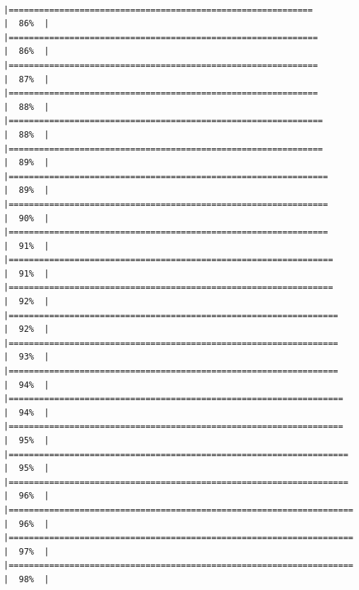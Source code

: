 \documentclass[
]{article}
\begin{document}
\begin{verbatim}
          |============================================================          |  86%  |                                                                              |=============================================================         |  86%  |                                                                              |=============================================================         |  87%  |                                                                              |=============================================================         |  88%  |                                                                              |==============================================================        |  88%  |                                                                              |==============================================================        |  89%  |                                                                              |===============================================================       |  89%  |                                                                              |===============================================================       |  90%  |                                                                              |===============================================================       |  91%  |                                                                              |================================================================      |  91%  |                                                                              |================================================================      |  92%  |                                                                              |=================================================================     |  92%  |                                                                              |=================================================================     |  93%  |                                                                              |=================================================================     |  94%  |                                                                              |==================================================================    |  94%  |                                                                              |==================================================================    |  95%  |                                                                              |===================================================================   |  95%  |                                                                              |===================================================================   |  96%  |                                                                              |====================================================================  |  96%  |                                                                              |====================================================================  |  97%  |                                                                              |====================================================================  |  98%  |                                                                     
\end{verbatim}
\end{document}
